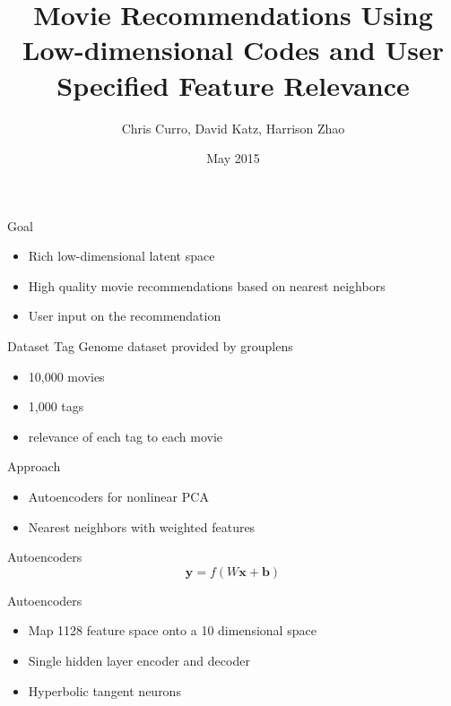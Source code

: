 \documentclass{beamer}
\title{Movie Recommendations Using Low-dimensional Codes and User Specified Feature Relevance}
\author{Chris Curro, David Katz, Harrison Zhao}
\date{May 2015}
\begin{document}
\begin{frame}
\titlepage
\end{frame}

\begin{frame}{Goal}
\begin{itemize}
\item Rich low-dimensional latent space
\item High quality movie recommendations based on nearest neighbors
\item User input on the recommendation
\end{itemize}
\end{frame}

\begin{frame}{Dataset}
Tag Genome dataset provided by grouplens
\begin{itemize}
\item 10,000 movies
\item 1,000 tags
\item relevance of each tag to each movie
\end{itemize}
\end{frame}

\begin{frame}{Approach}
\begin{itemize}
\item Autoencoders for nonlinear PCA
\item Nearest neighbors with weighted features
\end{itemize}
\end{frame}

\begin{frame}{Autoencoders}
\begin{equation}
\mathbf{y} = f\left(W\mathbf{x} + \mathbf{b}\right)
\end{equation}
\begin{center}

\end{center}
\end{frame}

\begin{frame}{Autoencoders}
\begin{itemize}
\item Map 1128 feature space onto a 10 dimensional space
\item Single hidden layer encoder and decoder
\item Hyperbolic tangent neurons
\end{itemize}
\end{frame}
\end{document}

